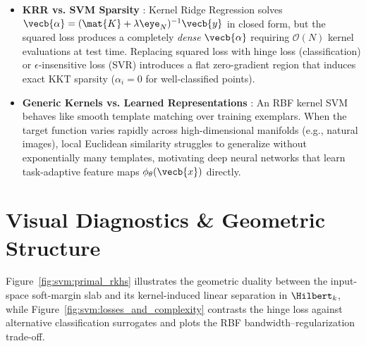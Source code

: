 \documentclass[../../../../master.tex]{subfiles}
\begin{document}
\begin{crossbook}
\begin{itemize}
  \item \textbf{KRR vs. SVM Sparsity} : Kernel Ridge Regression solves $\vecb{\alpha} = (\mat{K} + \lambda \eye_N)^{-1}\vecb{y}$ in closed form, but the squared loss produces a completely \emph{dense} $\vecb{\alpha}$ requiring $\mathcal{O}(N)$ kernel evaluations at test time. Replacing squared loss with hinge loss (classification) or $\epsilon$-insensitive loss (SVR) introduces a flat zero-gradient region that induces exact KKT sparsity ($\alpha_i = 0$ for well-classified points).
  \item \textbf{Generic Kernels vs. Learned Representations} : An RBF kernel SVM behaves like smooth template matching over training exemplars. When the target function varies rapidly across high-dimensional manifolds (e.g., natural images), local Euclidean similarity struggles to generalize without exponentially many templates, motivating deep neural networks that learn task-adaptive feature maps $\phi_{\theta}(\vecb{x})$ directly.
\end{itemize}
\end{crossbook}

\section{Visual Diagnostics \& Geometric Structure}

Figure~\ref{fig:svm:primal_rkhs} illustrates the geometric duality between the input-space soft-margin slab and its kernel-induced linear separation in $\Hilbert_k$, while Figure~\ref{fig:svm:losses_and_complexity} contrasts the hinge loss against alternative classification surrogates and plots the RBF bandwidth--regularization trade-off.
\end{document}
